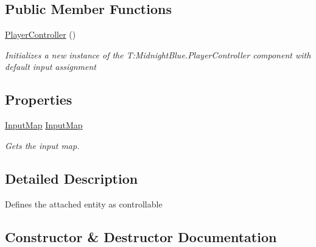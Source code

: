 \subsection*{Public Member Functions}
\begin{DoxyCompactItemize}
\item 
\hyperlink{class_m_b2_d_1_1_entity_component_1_1_player_controller_a184bfa3263b42a02f48035ae4acfba02}{Player\+Controller} ()
\begin{DoxyCompactList}\small\item\em Initializes a new instance of the T\+:\+Midnight\+Blue.\+Player\+Controller component with default input assignment \end{DoxyCompactList}\end{DoxyCompactItemize}
\subsection*{Properties}
\begin{DoxyCompactItemize}
\item 
\hyperlink{class_m_b2_d_1_1_i_o_1_1_input_map}{Input\+Map} \hyperlink{class_m_b2_d_1_1_entity_component_1_1_player_controller_a5fd930f90d72b416721ac93d9a81bc6d}{Input\+Map}
\begin{DoxyCompactList}\small\item\em Gets the input map. \end{DoxyCompactList}\end{DoxyCompactItemize}


\subsection{Detailed Description}
Defines the attached entity as controllable 



\subsection{Constructor \& Destructor Documentation}
\hypertarget{class_m_b2_d_1_1_entity_component_1_1_player_controller_a184bfa3263b42a02f48035ae4acfba02}{}\label{class_m_b2_d_1_1_entity_component_1_1_player_controller_a184bfa3263b42a02f48035ae4acfba02} 
